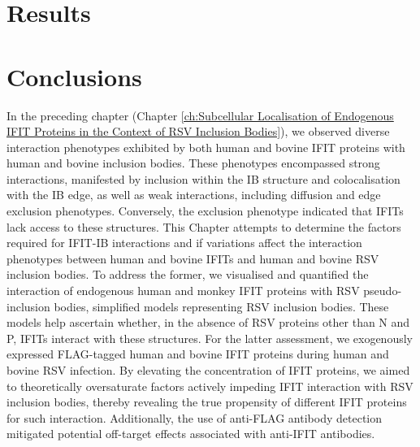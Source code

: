 \section{Results} \label{sec:Results-Chapter4}



\section{Conclusions} \label{sec:Conclusions-Chapter4}
In the preceding chapter (Chapter \ref{ch:Subcellular Localisation of Endogenous IFIT Proteins in the Context of RSV Inclusion Bodies}), we observed diverse interaction phenotypes exhibited by both human and bovine IFIT proteins with human and bovine inclusion bodies. These phenotypes encompassed strong interactions, manifested by inclusion within the IB structure and colocalisation with the IB edge, as well as weak interactions, including diffusion and edge exclusion phenotypes. Conversely, the exclusion phenotype indicated that IFITs lack access to these structures. This Chapter attempts to determine the factors required for IFIT-IB interactions and if variations affect the interaction phenotypes between human and bovine IFITs and human and bovine RSV inclusion bodies. To address the former, we visualised and quantified the interaction of endogenous human and monkey IFIT proteins with RSV pseudo-inclusion bodies, simplified models representing RSV inclusion bodies. These models help ascertain whether, in the absence of RSV proteins other than N and P, IFITs interact with these structures. For the latter assessment, we exogenously expressed FLAG-tagged human and bovine IFIT proteins during human and bovine RSV infection. By elevating the concentration of IFIT proteins, we aimed to theoretically oversaturate factors actively impeding IFIT interaction with RSV inclusion bodies, thereby revealing the true propensity of different IFIT proteins for such interaction. Additionally, the use of anti-FLAG antibody detection mitigated potential off-target effects associated with anti-IFIT antibodies.

